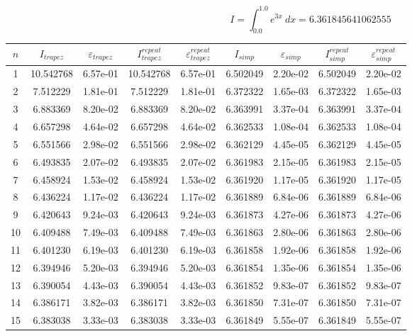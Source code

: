 \documentclass{report}[10pts]
\begin{document}
\clearpage


\[
   I=\int_{0.0}^{1.0}e^{3x}~dx
   =
   6.361845641062555
\]
\begin{center}\begin{tabular}{|c|c|c|c|c|c|c|c|c|}
   \hline
   $n$ & $I_{trapez}$ & ${\varepsilon}_{trapez}$ & $I_{trapez}^{repeat}$ & ${\varepsilon}_{trapez}^{repeat}$ & $I_{simp}$ & ${\varepsilon}_{simp}$ & $I_{simp}^{repeat}$ & ${\varepsilon}_{simp}^{repeat}$\\
   \hline
   1 & 10.542768 & 6.57e-01 & 10.542768 & 6.57e-01 & 6.502049 & 2.20e-02 & 6.502049 & 2.20e-02\\
   \hline
   2 & 7.512229 & 1.81e-01 & 7.512229 & 1.81e-01 & 6.372322 & 1.65e-03 & 6.372322 & 1.65e-03\\
   \hline
   3 & 6.883369 & 8.20e-02 & 6.883369 & 8.20e-02 & 6.363991 & 3.37e-04 & 6.363991 & 3.37e-04\\
   \hline
   4 & 6.657298 & 4.64e-02 & 6.657298 & 4.64e-02 & 6.362533 & 1.08e-04 & 6.362533 & 1.08e-04\\
   \hline
   5 & 6.551566 & 2.98e-02 & 6.551566 & 2.98e-02 & 6.362129 & 4.45e-05 & 6.362129 & 4.45e-05\\
   \hline
   6 & 6.493835 & 2.07e-02 & 6.493835 & 2.07e-02 & 6.361983 & 2.15e-05 & 6.361983 & 2.15e-05\\
   \hline
   7 & 6.458924 & 1.53e-02 & 6.458924 & 1.53e-02 & 6.361920 & 1.17e-05 & 6.361920 & 1.17e-05\\
   \hline
   8 & 6.436224 & 1.17e-02 & 6.436224 & 1.17e-02 & 6.361889 & 6.84e-06 & 6.361889 & 6.84e-06\\
   \hline
   9 & 6.420643 & 9.24e-03 & 6.420643 & 9.24e-03 & 6.361873 & 4.27e-06 & 6.361873 & 4.27e-06\\
   \hline
   10 & 6.409488 & 7.49e-03 & 6.409488 & 7.49e-03 & 6.361863 & 2.80e-06 & 6.361863 & 2.80e-06\\
   \hline
   11 & 6.401230 & 6.19e-03 & 6.401230 & 6.19e-03 & 6.361858 & 1.92e-06 & 6.361858 & 1.92e-06\\
   \hline
   12 & 6.394946 & 5.20e-03 & 6.394946 & 5.20e-03 & 6.361854 & 1.35e-06 & 6.361854 & 1.35e-06\\
   \hline
   13 & 6.390054 & 4.43e-03 & 6.390054 & 4.43e-03 & 6.361852 & 9.83e-07 & 6.361852 & 9.83e-07\\
   \hline
   14 & 6.386171 & 3.82e-03 & 6.386171 & 3.82e-03 & 6.361850 & 7.31e-07 & 6.361850 & 7.31e-07\\
   \hline
   15 & 6.383038 & 3.33e-03 & 6.383038 & 3.33e-03 & 6.361849 & 5.55e-07 & 6.361849 & 5.55e-07\\

\end{tabular}
\end{center}
\end{document}
